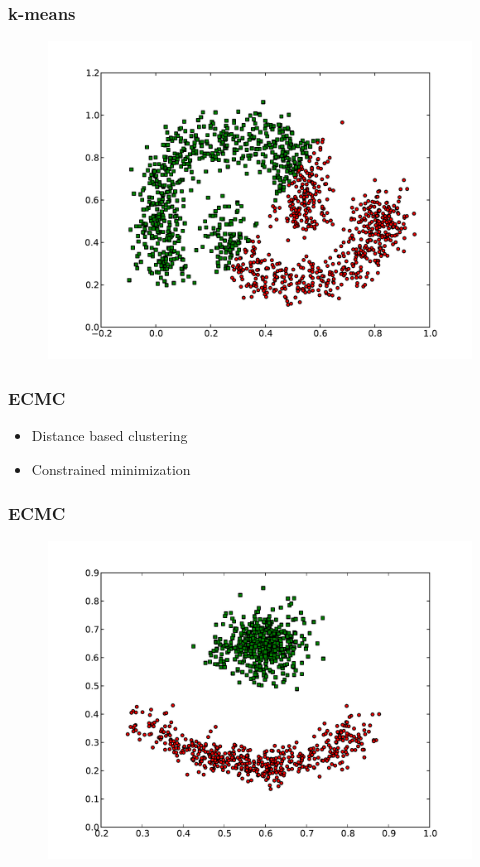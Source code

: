 \documentclass{beamer}
\begin{document}
\begin{frame}
\frametitle{k-means}
    \begin{figure}[]
    \includegraphics[scale=0.5]{kmeans_half-moons.pdf}
    \end{figure}
\end{frame}



\begin{frame}
\frametitle{ECMC}
    \begin{itemize}
	\item Distance based clustering
    	\item Constrained minimization
    \end{itemize}
\end{frame}

\begin{frame}
\frametitle{ECMC}
    \begin{figure}[]
    \includegraphics[scale=0.5]{ECMC_red-blue-clusters.pdf}
    \end{figure}
\end{frame}
\end{document}
